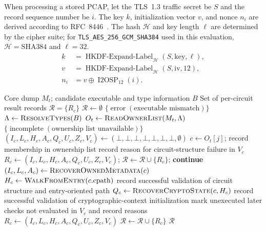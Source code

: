 \documentclass[10pt,a4paper]{article}
\newcommand{\code}[1]{\nolinkurl{#1}}
\begin{document}
When processing a stored PCAP, let the TLS~1.3 traffic secret be $S$ and the record sequence number be $i$. The key $k$, initialization vector $v$, and nonce $n_i$ are derived according to RFC~8446~\cite{rfc8446}. The hash $\mathcal H$ and key length $\ell$ are determined by the cipher suite; for \code{TLS_AES_256_GCM_SHA384} used in this evaluation, $\mathcal H=\mathrm{SHA384}$ and $\ell=32$.
\begin{align}
  k &= \operatorname{HKDF\mbox{-}Expand\mbox{-}Label}_{\mathcal H}(S,\mathrm{key},\ell),\label{eq:tls-key}\\
  v &= \operatorname{HKDF\mbox{-}Expand\mbox{-}Label}_{\mathcal H}(S,\mathrm{iv},12),\\
  n_i &= v \oplus \operatorname{I2OSP}_{12}(i).
\end{align}

\begin{algorithm}[H]
\caption{Circuit-state recovery rooted in ownership}
\label{alg:core-recovery}
\small
\begin{algorithmic}[1]
\Require Core dump $M_t$; candidate executable and type information $B$
\Ensure Set of per-circuit result records $\mathcal{R}=\{R_c\}$
\State $\mathcal{R}\gets\emptyset$
  \State \Return $\{\operatorname{error}(\text{executable mismatch})\}$
\EndIf
\State $\Lambda\gets\Call{ResolveTypes}{B}$
\State $O_t\gets\Call{ReadOwnerList}{M_t,\Lambda}$
  \State \Return $\{\operatorname{incomplete}(\text{ownership list unavailable})\}$
\EndIf
{}
  \State $(I_c,L_c,H_c,A_c,Q_c,U_c,Z_c,V_c)\gets(\bot,\bot,\bot,\bot,\bot,\bot,\bot,\emptyset)$
  \State $c\gets O_t[j]$; record membership in ownership list
    \State record reason for circuit-structure failure in $V_c$
    \State $R_c\gets(I_c,L_c,H_c,A_c,Q_c,U_c,Z_c,V_c)$; $\mathcal{R}\gets\mathcal{R}\cup\{R_c\}$; \textbf{continue}
  \EndIf
    \State $(I_c,L_c,A_c)\gets\Call{RecoverOwnedMetadata}{c}$
    \State $H_c\gets\Call{WalkFromEntry}{c.\mathrm{cpath}}$
  \EndIf
    \State record successful validation of circuit structure and entry-oriented path
    \State $Q_c\gets\Call{RecoverCryptoState}{c,H_c}$
      \State record successful validation of cryptographic-context initialization
    \EndIf
  \EndIf
  \State mark unexecuted later checks not evaluated in $V_c$ and record reasons
  \State $R_c\gets(I_c,L_c,H_c,A_c,Q_c,U_c,Z_c,V_c)$
  \State $\mathcal{R}\gets\mathcal{R}\cup\{R_c\}$
\EndFor
\State \Return $\mathcal{R}$
\end{algorithmic}
\end{algorithm}
\end{document}
